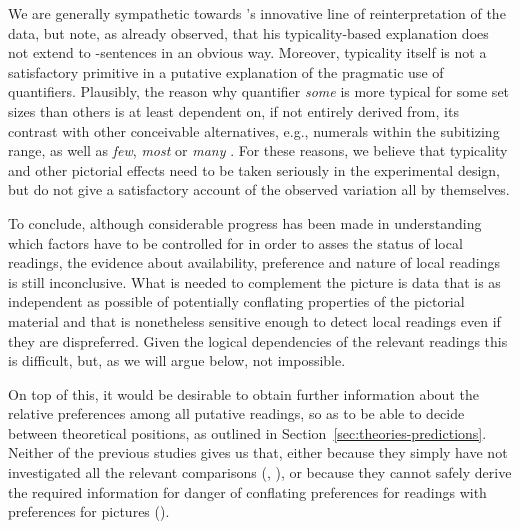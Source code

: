 \documentclass[fleqn,reqno,10pt,draft]{article}
\renewcommand{\es}{\acro{es}}
\begin{document}
We are generally sympathetic towards
\citeauthor{Tielvan-Tiel2012:Embedded-Scalar}'s innovative line of
reinterpretation of the data, but note, as
\citet{ChemlaSpector2010:Experimental-Ev} already observed, that his
typicality-based explanation does not extend to \es-sentences in an
obvious way. Moreover, typicality itself is not a satisfactory
primitive in a putative explanation of the pragmatic use of
quantifiers. Plausibly, the reason why quantifier \emph{some} is more
typical for some set sizes than others is at least dependent on, if not
entirely derived from, its contrast with other conceivable
alternatives, e.g., numerals within the subitizing range, as well as
\emph{few}, \emph{most} or \emph{many}
\citep[c.f.][]{DegenTanenhaus2012:Processing-Scal}. For these reasons,
we believe that typicality and other pictorial effects need to be
taken seriously in the experimental design, but do not give a
satisfactory account of the observed variation all by themselves.

To conclude, although considerable progress has been made in
understanding which factors have to be controlled for in order to
asses the status of local readings, the evidence about availability,
preference and nature of local readings is still inconclusive. What is
needed to complement the picture is data that is as independent as
possible of potentially conflating properties of the pictorial
material and that is nonetheless sensitive enough to detect local
readings even if they are dispreferred. Given the logical dependencies
of the relevant readings this is difficult, but, as we will argue
below, not impossible.

On top of this, it would be desirable to obtain further information
about the relative preferences among all putative readings, so as to
be able to decide between theoretical positions, as outlined in
Section~\ref{sec:theories-predictions}. Neither of the previous
studies gives us that, either because they simply have not
investigated all the relevant comparisons
(\citet{GeurtsPouscoulous2009:Embedded-Implic},
\citet{CliftonDube2010:Embedded-Implic}), or because they cannot
safely derive the required information for danger of conflating
preferences for readings with preferences for pictures
(\citet{ChemlaSpector2010:Experimental-Ev}).
\end{document}
